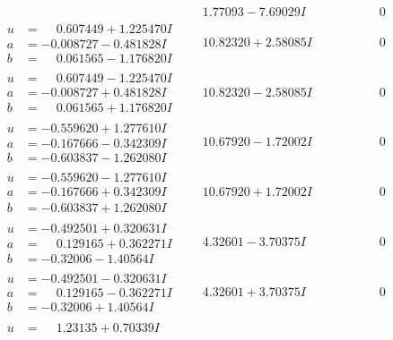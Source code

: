 \documentclass[1p]{elsarticle_modified}
\theoremstyle{definition}
\begin{document}
$$\begin{array}{c|c|c}
 & \phantom{-}1.77093 - 7.69029 I & \phantom{-0.000000 } 0 \\ \hline\begin{aligned}
u &= \phantom{-}0.607449 + 1.225470 I \\
a &= -0.008727 - 0.481828 I \\
b &= \phantom{-}0.061565 - 1.176820 I\end{aligned}
 & \phantom{-}10.82320 + 2.58085 I & \phantom{-0.000000 } 0 \\ \hline\begin{aligned}
u &= \phantom{-}0.607449 - 1.225470 I \\
a &= -0.008727 + 0.481828 I \\
b &= \phantom{-}0.061565 + 1.176820 I\end{aligned}
 & \phantom{-}10.82320 - 2.58085 I & \phantom{-0.000000 } 0 \\ \hline\begin{aligned}
u &= -0.559620 + 1.277610 I \\
a &= -0.167666 - 0.342309 I \\
b &= -0.603837 - 1.262080 I\end{aligned}
 & \phantom{-}10.67920 - 1.72002 I & \phantom{-0.000000 } 0 \\ \hline\begin{aligned}
u &= -0.559620 - 1.277610 I \\
a &= -0.167666 + 0.342309 I \\
b &= -0.603837 + 1.262080 I\end{aligned}
 & \phantom{-}10.67920 + 1.72002 I & \phantom{-0.000000 } 0 \\ \hline\begin{aligned}
u &= -0.492501 + 0.320631 I \\
a &= \phantom{-}0.129165 + 0.362271 I \\
b &= -0.32006 - 1.40564 I\end{aligned}
 & \phantom{-}4.32601 - 3.70375 I & \phantom{-0.000000 } 0 \\ \hline\begin{aligned}
u &= -0.492501 - 0.320631 I \\
a &= \phantom{-}0.129165 - 0.362271 I \\
b &= -0.32006 + 1.40564 I\end{aligned}
 & \phantom{-}4.32601 + 3.70375 I & \phantom{-0.000000 } 0 \\ \hline\begin{aligned}
u &= \phantom{-}1.23135 + 0.70339 I \\

\end{aligned}
\end{array}$$
\end{document}
